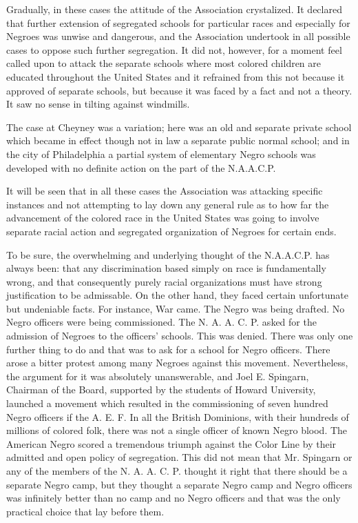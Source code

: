 \documentclass[letterpaper,10pt,english]{jupyterBook}
\begin{document}
\sphinxAtStartPar
Gradually, in these cases the attitude of the Association crystalized. It declared that further extension of segregated schools for particular races and especially for Negroes was unwise and dangerous, and the Association undertook in all possible cases to oppose such further segregation. It did not, however, for a moment feel called upon to attack the separate schools where most colored children are educated throughout the United States and it refrained from this not because it approved of separate schools, but because it was faced by a fact and not a theory. It saw no sense in tilting against windmills.

\sphinxAtStartPar
The case at Cheyney was a variation; here was an old and separate private school which became in effect though not in law a separate public normal school; and in the city of Philadelphia a partial system of elementary Negro schools was developed with no definite action on the part of the N.A.A.C.P.

\sphinxAtStartPar
It will be seen that in all these cases the Association was attacking specific instances and not attempting to lay down any general rule as to how far the advancement of the colored race in the United States was going to involve separate racial action and segregated organization of Negroes for certain ends.

\sphinxAtStartPar
To be sure, the overwhelming and underlying thought of the N.A.A.C.P. has always been: that any discrimination based simply on race is fundamentally wrong, and that consequently purely racial organizations must have strong justification to be admissable. On the other hand, they faced certain unfortunate but undeniable facts. For instance, War came. The Negro was being drafted. No Negro officers were being commissioned. The N. A. A. C. P. asked for the admission of Negroes to the officers’ schools. This was denied. There was only one further thing to do and that was to ask for a school for Negro officers. There arose a bitter protest among many Negroes against this movement. Nevertheless, the argument for it was absolutely unanswerable, and Joel E. Spingarn, Chairman of the Board, supported by the students of Howard University, launched a movement which resulted in the commissioning of seven hundred Negro officers if the A. E. F. In all the British Dominions, with their hundreds of millions of colored folk, there was not a single officer of known Negro blood. The American Negro scored a tremendous triumph against the Color Line by their admitted and open policy of segregation. This did not mean that Mr. Spingarn or any of the members of the N. A. A. C. P. thought it right that there should be a separate Negro camp, but they thought a separate Negro camp and Negro officers was infinitely better than no camp and no Negro officers and that was the only practical choice that lay before them.
\end{document}
